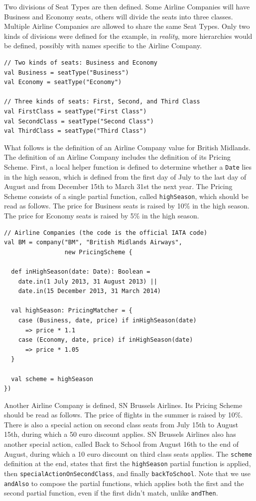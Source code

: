 \documentclass[a4paper]{article}
\newcommand{\cc}[1]{\texttt{#1}}
\renewcommand{\sc}[1]{\lstinline{#1}}
\begin{document}
Two divisions of Seat Types are then defined.
Some Airline Companies will have Business and Economy seats, others will divide the seats into three classes.
Multiple Airline Companies are allowed to share the same Seat Types.
Only two kinds of divisions were defined for the example, in \emph{reality}, more hierarchies would be defined, possibly with names specific to the Airline Company.

\begin{lstlisting}
// Two kinds of seats: Business and Economy
val Business = seatType("Business")
val Economy = seatType("Economy")

// Three kinds of seats: First, Second, and Third Class
val FirstClass = seatType("First Class")
val SecondClass = seatType("Second Class")
val ThirdClass = seatType("Third Class")
\end{lstlisting}

What follows is the definition of an Airline Company value for British Midlands.
The definition of an Airline Company includes the definition of its Pricing Scheme.
First, a local helper function is defined to determine whether a \cc{Date} lies in the high season, which is defined from the first day of July to the last day of August and from December 15th to March 31st the next year.
The Pricing Scheme consists of a single partial function, called \cc{highSeason}, which should be read as follows.
The price for Business seats is raised by 10\% in the high season.
The price for Economy seats is raised by 5\% in the high season.

\begin{lstlisting}
// Airline Companies (the code is the official IATA code)
val BM = company("BM", "British Midlands Airways",
                 new PricingScheme {

  def inHighSeason(date: Date): Boolean =
    date.in(1 July 2013, 31 August 2013) ||
    date.in(15 December 2013, 31 March 2014)

  val highSeason: PricingMatcher = {
    case (Business, date, price) if inHighSeason(date)
      => price * 1.1
    case (Economy, date, price) if inHighSeason(date)
      => price * 1.05
  }

  val scheme = highSeason
})
\end{lstlisting}

Another Airline Company is defined, SN Brussels Airlines.
Its Pricing Scheme should be read as follows.
The price of flights in the summer is raised by 10\%.
There is also a special action on second class seats from July 15th to August 15th, during which a 50 euro discount applies.
SN Brussels Airlines also has another special action, called Back to School from August 16th to the end of August, during which a 10 euro discount on third class seats applies.
The \sc{scheme} definition at the end, states that first the \cc{highSeason} partial function is applied, then \cc{special\-Action\-On\-Second\-Class}, and finally \cc{backToSchool}.
Note that we use \sc{andAlso} to compose the partial functions, which applies both the first and the second partial function, even if the first didn't match, unlike \sc{andThen}.
\end{document}
